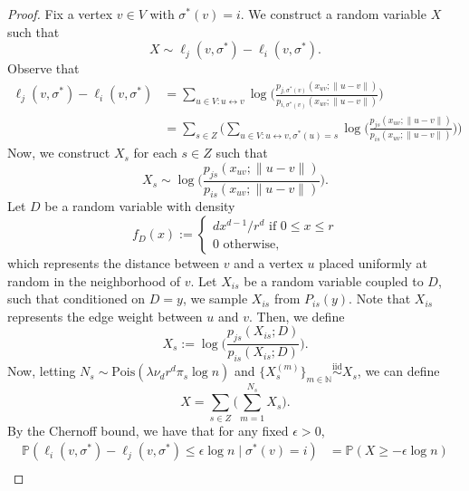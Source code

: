 \documentclass[10pt,a4paper]{amsart}
\newcommand{\N}{\mathbb{N}}
\newcommand{\visible}{\leftrightarrow{}}
\renewcommand{\P}{\mathbb{P}}
\begin{document}
\begin{proof}
    Fix a vertex $v \in V$ with $\sigma^*(v) = i$. We construct a random variable $X$ such that 
    \begin{equation*}
        X \sim \ell_j(v, \sigma^*) - \ell_i(v, \sigma^*).
    \end{equation*}
    Observe that
    \begin{align*}
         \ell_j(v, \sigma^*) - \ell_i(v, \sigma^*) &= \sum_{u \in V: u \visible v} \log\bigg(\frac{p_{j, \sigma^*(v)}(x_{uv}; \|u-v\|)}{p_{i, \sigma^*(v)}(x_{uv}; \|u-v\|)}\bigg) \\
         &= \sum_{s \in Z} \bigg( \sum_{u \in V: u \visible v, \sigma^*(u) = s} \log\Big(\frac{p_{js}(x_{uv}; \|u-v\|)}{p_{is}(x_{uv}; \|u-v\|)}\Big) \bigg)
    \end{align*}
    Now, we construct $X_s$ for each $s \in Z$ such that
    \begin{equation*}
        X_s \sim \log\bigg(\frac{p_{js}(x_{uv}; \|u-v\|)}{p_{is}(x_{uv}; \|u-v\|)}\bigg).
    \end{equation*}
    Let $D$ be a random variable with density
    \begin{equation*}
        f_D(x) :=
        \begin{cases}
            dx^{d-1}/r^d \text{ if } 0 \leq x \leq r \\
            0 \text{ otherwise,} 
        \end{cases}
    \end{equation*}
    which represents the distance between $v$ and a vertex $u$ placed uniformly at random in the neighborhood of $v$. Let $X_{is}$ be a random variable coupled to $D$, such that conditioned on $D = y$, we sample $X_{is}$ from $P_{is}(y)$. Note that $X_{is}$ represents the edge weight between $u$ and $v$. Then, we define
    \begin{equation*}
        X_s := \log\bigg( \frac{p_{js}(X_{is} ;D)}{p_{is}(X_{is} ;D)} \bigg).
    \end{equation*}  
    Now, letting $N_s \sim \text{Pois}(\lambda \nu_d r^d \pi_s \log n)$ and $\{X_s^{(m)}\}_{m \in \N} \overset{\text{iid}}{\sim} X_s$, we can define
    \begin{equation*}
        X = \sum_{s \in Z}\bigg( \sum_{m=1}^{N_s} X_s \bigg).
    \end{equation*}
    By the Chernoff bound, we have that for any fixed $\epsilon > 0$,
    \begin{align}
        \P(\ell_i(v, \sigma^*) - \ell_j(v, \sigma^*) \leq \epsilon \log n \mid \sigma^*(v) = i) &= \P(X \geq -\epsilon \log n) \nonumber \\

\end{align}
\end{proof}
\end{document}
